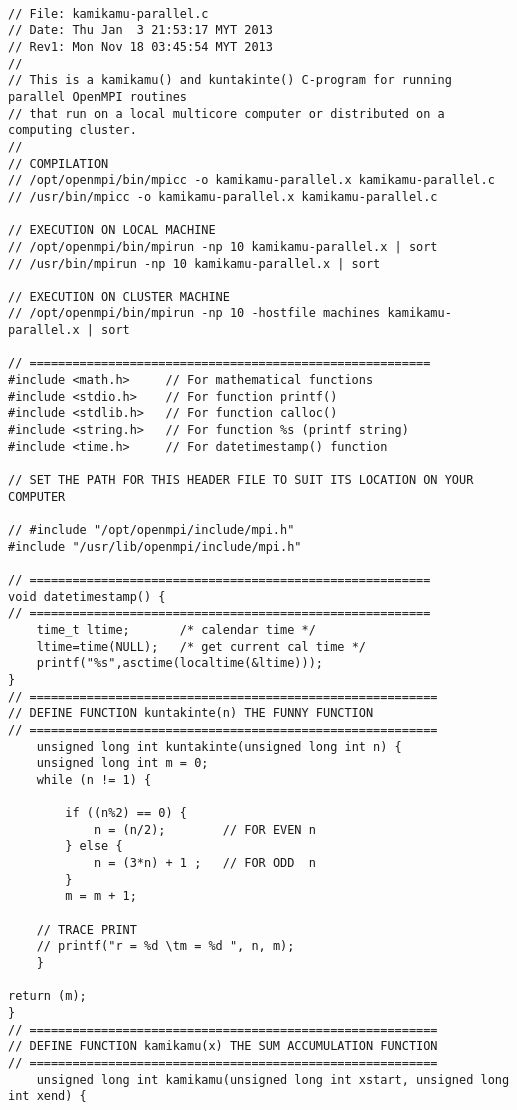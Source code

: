 \begin{lstlisting}[caption={App4-C++-MPI Example Parallel Multiprocessing}, label=App4-C++-MPI Example Parallel Multiprocessing]

// File: kamikamu-parallel.c
// Date: Thu Jan  3 21:53:17 MYT 2013
// Rev1: Mon Nov 18 03:45:54 MYT 2013
//
// This is a kamikamu() and kuntakinte() C-program for running parallel OpenMPI routines 
// that run on a local multicore computer or distributed on a computing cluster. 
//
// COMPILATION 
// /opt/openmpi/bin/mpicc -o kamikamu-parallel.x kamikamu-parallel.c 
// /usr/bin/mpicc -o kamikamu-parallel.x kamikamu-parallel.c 

// EXECUTION ON LOCAL MACHINE
// /opt/openmpi/bin/mpirun -np 10 kamikamu-parallel.x | sort
// /usr/bin/mpirun -np 10 kamikamu-parallel.x | sort

// EXECUTION ON CLUSTER MACHINE
// /opt/openmpi/bin/mpirun -np 10 -hostfile machines kamikamu-parallel.x | sort

// ========================================================
#include <math.h>     // For mathematical functions
#include <stdio.h>    // For function printf()
#include <stdlib.h>   // For function calloc()
#include <string.h>   // For function %s (printf string)
#include <time.h>     // For datetimestamp() function

// SET THE PATH FOR THIS HEADER FILE TO SUIT ITS LOCATION ON YOUR COMPUTER

// #include "/opt/openmpi/include/mpi.h"
#include "/usr/lib/openmpi/include/mpi.h"

// ========================================================
void datetimestamp() {
// ========================================================
	time_t ltime; 		/* calendar time */
	ltime=time(NULL); 	/* get current cal time */
	printf("%s",asctime(localtime(&ltime)));
}
// =========================================================
// DEFINE FUNCTION kuntakinte(n) THE FUNNY FUNCTION
// =========================================================
	unsigned long int kuntakinte(unsigned long int n) {
	unsigned long int m = 0;
	while (n != 1) {

		if ((n%2) == 0) {
			n = (n/2);        // FOR EVEN n
		} else { 
			n = (3*n) + 1 ;   // FOR ODD  n
		} 
		m = m + 1;

	// TRACE PRINT
	// printf("r = %d \tm = %d ", n, m);
	}

return (m);
}
// =========================================================
// DEFINE FUNCTION kamikamu(x) THE SUM ACCUMULATION FUNCTION
// =========================================================
	unsigned long int kamikamu(unsigned long int xstart, unsigned long int xend) {
	

\end{lstlisting}
